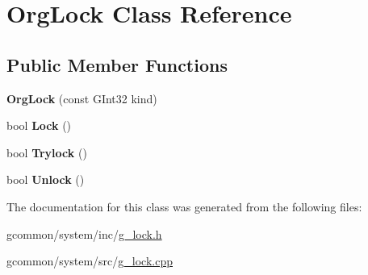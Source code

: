 \hypertarget{class_org_lock}{\section{Org\-Lock Class Reference}
\label{class_org_lock}
}
\subsection*{Public Member Functions}
\begin{DoxyCompactItemize}
\item 
\hypertarget{class_org_lock_a9cd83be455e4dd5416d86f40e3d35bcb}{{\bfseries Org\-Lock} (const G\-Int32 kind)}\label{class_org_lock_a9cd83be455e4dd5416d86f40e3d35bcb}

\item 
\hypertarget{class_org_lock_a10023c99c490bad83899a964fad72ba9}{bool {\bfseries Lock} ()}\label{class_org_lock_a10023c99c490bad83899a964fad72ba9}

\item 
\hypertarget{class_org_lock_ab036157ef7310fb6b5a9544ae72890d9}{bool {\bfseries Trylock} ()}\label{class_org_lock_ab036157ef7310fb6b5a9544ae72890d9}

\item 
\hypertarget{class_org_lock_ab5dbc7a41deadfe907cc9ce0bbed53f1}{bool {\bfseries Unlock} ()}\label{class_org_lock_ab5dbc7a41deadfe907cc9ce0bbed53f1}

\end{DoxyCompactItemize}


The documentation for this class was generated from the following files\-:\begin{DoxyCompactItemize}
\item 
gcommon/system/inc/\hyperlink{g__lock_8h}{g\-\_\-lock.\-h}\item 
gcommon/system/src/\hyperlink{g__lock_8cpp}{g\-\_\-lock.\-cpp}\end{DoxyCompactItemize}
